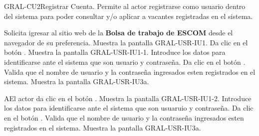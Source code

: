 
\begin{UseCase}{GRAL-CU2}{Registrar Cuenta.}{
	Permite al actor registrarse como usuario dentro del sistema para poder consultar y/o aplicar a vacantes registradas en el sistema.  
}
\end{UseCase}

\begin{UCtrayectoria}
	\UCpaso [\UCactor] Solicita igresar al sitio web de la \textbf{Bolsa de trabajo de ESCOM} desde el navegador de su preferencia.
    \UCpaso [\UCsist] Muestra la pantalla GRAL-USR-IU1.
	\UCpaso [\UCactor] Da clic en el botón . 
	\UCpaso [\UCsist] Muestra la pantalla GRAL-USR-IU1-1.
	\UCpaso [\UCactor] Introduce los datos para identificarse ante el sistema que son usuario y contraseña.\label{cu3-dd} 
	\UCpaso [\UCactor] Da clic en el botón . 
    \UCpaso [\UCsist] Valida que el nombre de usuario y la contraseña ingresados esten registrados en el sistema. 
    \UCpaso [\UCsist] Muestra la pantalla GRAL-USR-IU3a.
\end{UCtrayectoria}

\begin{UCtrayectoriaA}{A}{El actor da clic en el botón .}
	\UCpaso [\UCsist] Muestra la pantalla GRAL-USR-IU1-2.
	\UCpaso [\UCactor] Introduce los datos para identificarse ante el sistema que son usuaruio y contraseña.\label{cu3-dd} 
	\UCpaso [\UCactor] Da clic en el botón . 
    \UCpaso [\UCsist] Valida que el nombre de usuario y la contraseña ingresados esten registrados en el sistema. 
    \UCpaso [\UCsist] Muestra la pantalla GRAL-USR-IU3a.
\end{UCtrayectoriaA} 